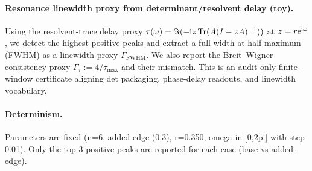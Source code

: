 \paragraph{Resonance linewidth proxy from determinant/resolvent delay (toy).} \AuditTag Using the resolvent-trace delay proxy $\tau(\omega)=\Im(-\mathrm{i} z\,\mathrm{Tr}(A(I-zA)^{-1}))$ at $z=r\mathrm{e}^{\mathrm{i}\omega}$, we detect the highest positive peaks and extract a full width at half maximum (FWHM) as a linewidth proxy $\Gamma_{\mathrm{FWHM}}$. We also report the Breit--Wigner consistency proxy $\Gamma_{\tau}:=4/\tau_{\max}$ and their mismatch. This is an audit-only finite-window certificate aligning det packaging, phase-delay readouts, and linewidth vocabulary.
\paragraph{Determinism.} \AuditTag Parameters are fixed (n=6, added edge (0,3), r=0.350, omega in [0,2pi] with step 0.01). Only the top 3 positive peaks are reported for each case (base vs added-edge).